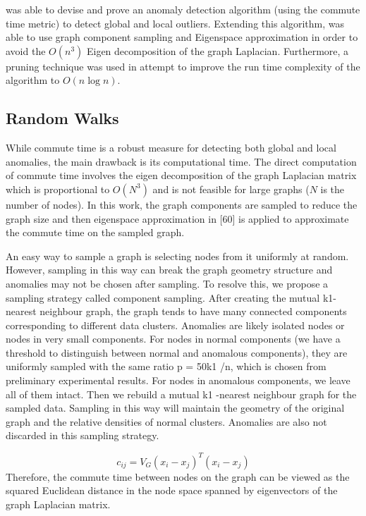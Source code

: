 \citeauthor{Khoa:2012} was able to devise and prove an anomaly detection
algorithm (using the commute time metric) to detect global and local outliers.
Extending this algorithm, \citeauthor{Khoa:2012} was able to use graph component
sampling and Eigenspace approximation in order to avoid the $O(n^3)$ Eigen
decomposition of the graph Laplacian. Furthermore, a pruning technique was used
in attempt to improve the run time complexity of the algorithm to $O(n\log n)$.

\subsection{Random Walks}
\label{anomalyDetection::randomWalks}

\cite{Khoa:2012}
While commute time is a robust measure for detecting both global and local anomalies, the main drawback is its computational time. The direct computation of commute time involves the eigen decomposition of the graph Laplacian matrix which is proportional to $O(N^3)$ and is not feasible for large graphs ($N$ is the number of nodes). In this work, the graph components are sampled to reduce the graph size and then eigenspace approximation in [60] is applied to approximate the commute time on the sampled graph.

An easy way to sample a graph is selecting nodes from it uniformly at random. However, sampling in this way can break the graph geometry structure and anomalies may not be chosen after sampling. To resolve this, we propose a sampling strategy called component sampling. After creating the mutual k1-nearest neighbour graph, the graph tends to have many connected components corresponding to different data clusters.
Anomalies are likely isolated nodes or nodes in very small components. For nodes in normal components (we have a threshold to distinguish between normal and anomalous components), they are uniformly sampled with the same ratio p = 50k1 /n, which is chosen from preliminary experimental results. For nodes in anomalous components, we leave all of them intact. Then we rebuild a mutual k1 -nearest neighbour graph for
the sampled data. Sampling in this way will maintain the geometry of the original graph and the relative densities of normal clusters. Anomalies are also not discarded in this sampling strategy.

\begin{equation}
    c_{ij} = V_G(x_i - x_j)^T (x_i - x_j)
\end{equation}
Therefore, the commute time between nodes on the graph can be viewed as the
squared Euclidean distance in the node space spanned by eigenvectors of the graph
Laplacian matrix.

